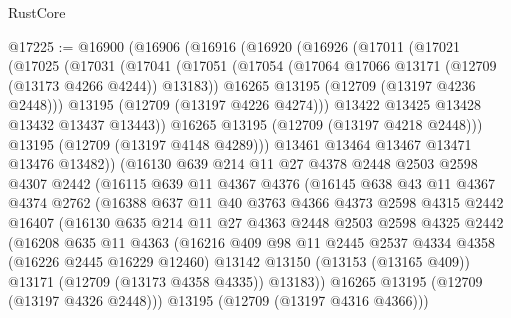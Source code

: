 \begin{lexlean}{RustCore}
\begin{coremodule}
@17225 := @16900
    (@16906
      (@16916
        (@16920
          (@16926
            (@17011
              (@17021
                (@17025
                  (@17031
                    (@17041
                      (@17051
                        (@17054 (@17064 @17066 @13171 (@12709 (@13173 @4266 @4244)) @13183))
                        @16265
                        @13195
                        (@12709 (@13197 @4236 @2448)))
                      @13195
                      (@12709 (@13197 @4226 @4274)))
                    @13422
                    @13425
                    @13428
                    @13432
                    @13437
                    @13443))
                @16265
                @13195
                (@12709 (@13197 @4218 @2448)))
              @13195
              (@12709 (@13197 @4148 @4289)))
            @13461
            @13464
            @13467
            @13471
            @13476
            @13482))
        (@16130
          @639
          @214
          @11
          @27
          @4378
          @2448
          @2503
          @2598
          @4307
          @2442
          (@16115
            @639
            @11
            @4367
            @4376
            (@16145
              @638
              @43
              @11
              @4367
              @4374
              @2762
              (@16388
                @637
                @11
                @40
                @3763
                @4366
                @4373
                @2598
                @4315
                @2442
                @16407
                (@16130
                  @635
                  @214
                  @11
                  @27
                  @4363
                  @2448
                  @2503
                  @2598
                  @4325
                  @2442
                  (@16208
                    @635
                    @11
                    @4363
                    (@16216
                      @409
                      @98
                      @11
                      @2445
                      @2537
                      @4334
                      @4358
                      (@16226 @2445 @16229 @12460)
                      @13142
                      @13150
                      (@13153 (@13165 @409))
                      @13171
                      (@12709 (@13173 @4358 @4335))
                      @13183))
                  @16265
                  @13195
                  (@12709 (@13197 @4326 @2448)))
                @13195
                (@12709 (@13197 @4316 @4366)))

\end{coremodule}
\end{lexlean}
